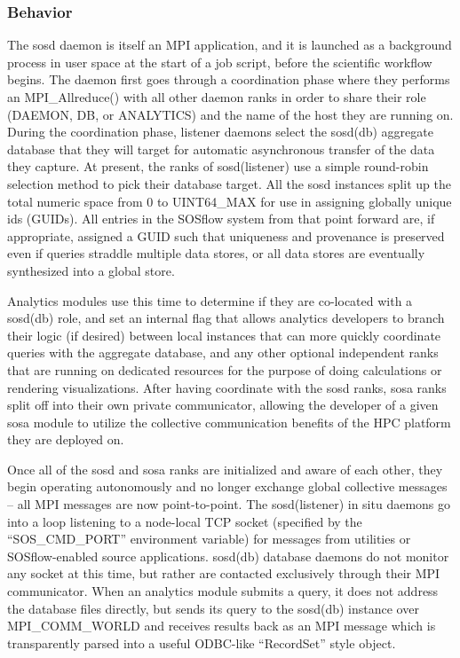 \subsubsection{Behavior}
The sosd daemon is itself an MPI application, and it is launched as a
background process in user space at the start of a job script, before
the scientific workflow begins.  The daemon first goes through a
coordination phase where they performs an MPI\_Allreduce() with all
other daemon ranks in order to share their role (DAEMON, DB, or
ANALYTICS) and the name of the host they are running on. During the
coordination phase, listener daemons select the sosd(db) aggregate
database that they will target for automatic asynchronous transfer of
the data they capture. At present, the ranks of sosd(listener) use a
simple round-robin selection method to pick their database target. All
the sosd instances split up the total numeric space from 0 to
UINT64\_MAX for use in assigning globally unique ids (GUIDs). All
entries in the SOSflow system from that point forward are, if
appropriate, assigned a GUID such that uniqueness and provenance is
preserved even if queries straddle multiple data stores, or all data
stores are eventually synthesized into a global store.

Analytics modules use this time to determine if they are co-located
with a sosd(db) role, and set an internal flag that allows analytics
developers to branch their logic (if desired) between local instances that
can more quickly coordinate queries with the aggregate database, and any 
other optional independent ranks that are running on dedicated resources
for the purpose of doing calculations or rendering visualizations. After
having coordinate with the sosd ranks, sosa ranks split off into their own
private communicator, allowing the developer of a given sosa module to
utilize the collective communication benefits of the HPC platform they
are deployed on.

Once all of the sosd and sosa ranks are initialized and aware of each
other, they begin operating autonomously and no longer exchange global
collective messages -- all MPI messages are now point-to-point. The
sosd(listener) in situ daemons go into a loop listening to a
node-local TCP socket (specified by the ``SOS\_CMD\_PORT'' environment
variable) for messages from utilities or SOSflow-enabled source
applications.  sosd(db) database daemons do not monitor any socket at
this time, but rather are contacted exclusively through their MPI
communicator. When an analytics module submits a query, it does not
address the database files directly, but sends its query to the
sosd(db) instance over MPI\_COMM\_WORLD and receives results back as
an MPI message which is transparently parsed into a useful ODBC-like
``RecordSet'' style object.

